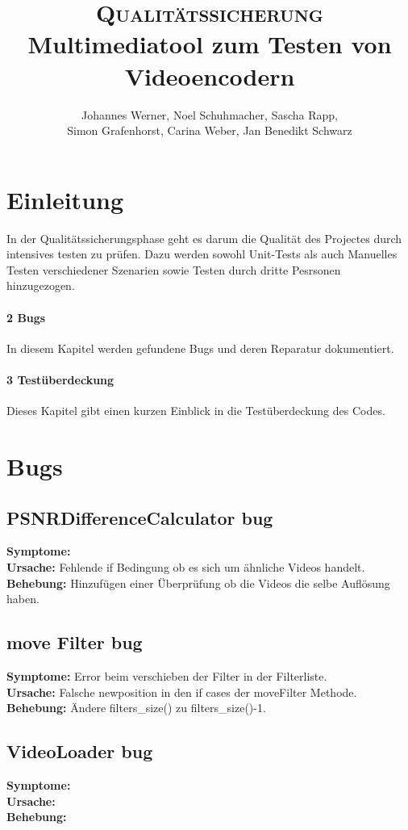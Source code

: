 \documentclass{scrartcl}
\title{\fontsize{40}{48} \selectfont \textsc{Qualitätssicherung}\\
{\fontsize{18}{18} \selectfont Multimediatool zum Testen von Videoencodern}}}
\author {Johannes Werner, Noel Schuhmacher, Sascha Rapp,\\ Simon Grafenhorst,
Carina Weber, Jan Benedikt Schwarz}
\begin{document}
 {
\maketitle
\thispagestyle{empty}
\pagestyle{empty}
\newpage
\setcounter{page}{0}
\tableofcontents
\clearpage
\pagestyle{plain}
\newpage
\section{Einleitung}
In der Qualitätssicherungsphase geht es darum die Qualität des Projectes  durch intensives testen zu prüfen. Dazu werden sowohl Unit-Tests als auch Manuelles Testen verschiedener Szenarien sowie Testen durch dritte Pesrsonen hinzugezogen.
\paragraph{2 Bugs} In diesem Kapitel werden gefundene Bugs und deren Reparatur dokumentiert.
\paragraph{3 Testüberdeckung} Dieses Kapitel gibt einen kurzen Einblick in die Testüberdeckung des Codes.
\newpage
\section{Bugs}
\subsection{PSNRDifferenceCalculator bug}
\textbf{Symptome:}\\
\textbf{Ursache:} Fehlende if Bedingung ob es sich um ähnliche Videos handelt.\\
\textbf{Behebung:} Hinzufügen einer Überprüfung ob die Videos die selbe Auflösung haben.
\subsection{move Filter bug}
\textbf{Symptome:} Error beim verschieben der Filter in der Filterliste.\\
\textbf{Ursache:} Falsche newposition in den if cases der moveFilter Methode.\\
\textbf{Behebung:} Ändere filters\_size() zu filters\_size()-1.
\subsection{VideoLoader bug}
\textbf{Symptome:}\\
\textbf{Ursache:}\\
\textbf{Behebung:}
}
\end{document}

